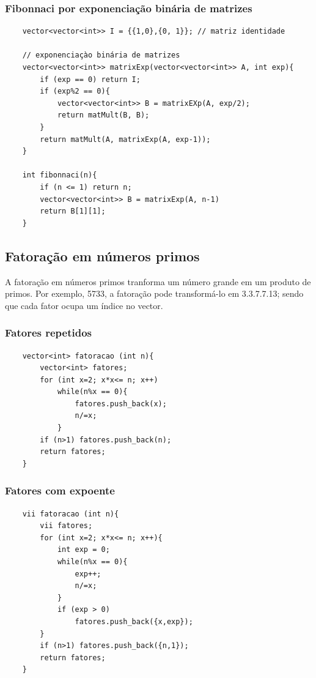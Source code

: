 \subsubsection{Fibonnaci por exponenciação binária de matrizes}

\begin{verbatim}
    vector<vector<int>> I = {{1,0},{0, 1}}; // matriz identidade

    // exponenciaçào binária de matrizes
    vector<vector<int>> matrixExp(vector<vector<int>> A, int exp){
        if (exp == 0) return I;
        if (exp%2 == 0){
            vector<vector<int>> B = matrixEXp(A, exp/2);
            return matMult(B, B);
        }
        return matMult(A, matrixExp(A, exp-1));
    }

    int fibonnaci(n){
        if (n <= 1) return n;
        vector<vector<int>> B = matrixExp(A, n-1)
        return B[1][1];
    }
\end{verbatim}

\subsection{Fatoração em números primos}
A fatoração em números primos tranforma um número grande em um produto de primos. Por exemplo, 5733, a fatoração pode transformá-lo em 3.3.7.7.13; sendo que cada fator ocupa um índice no vector.
\subsubsection{Fatores repetidos}
\begin{verbatim}
    vector<int> fatoracao (int n){
        vector<int> fatores;
        for (int x=2; x*x<= n; x++)
            while(n%x == 0){
                fatores.push_back(x);
                n/=x;
            }
        if (n>1) fatores.push_back(n);
        return fatores;
    }
\end{verbatim}
\subsubsection{Fatores com expoente}
\begin{verbatim}
    vii fatoracao (int n){
        vii fatores;
        for (int x=2; x*x<= n; x++){
            int exp = 0;
            while(n%x == 0){
                exp++;
                n/=x;
            }
            if (exp > 0)
                fatores.push_back({x,exp});
        }
        if (n>1) fatores.push_back({n,1});
        return fatores;
    }
\end{verbatim}
